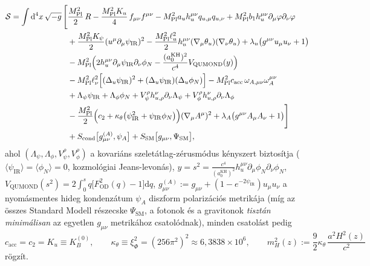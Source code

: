 \documentclass[11pt,a4paper]{article}
\begin{document}
\begin{equation}
\begin{aligned}
  \mathcal{S} = \int \mathrm{d}^4x\,\sqrt{-g}\,\Biggl[
  &\frac{M_{\mathrm{Pl}}^2}{2}\,R - \frac{M_{\mathrm{Pl}}^2 K_u}{4}\,f_{\mu\nu}f^{\mu\nu} - M_{\mathrm{Pl}}^2 a_u h_u^{\mu\nu}q_{u,\mu}q_{u,\nu} + M_{\mathrm{Pl}}^2 b_1 h_u^{\mu\nu}\partial_\mu\varphi\partial_\nu\varphi \\
  &+ \frac{M_{\mathrm{Pl}}^2 K_\psi}{2}(u^\mu\partial_\mu\psi_{\mathrm{IR}})^2 - \frac{M_{\mathrm{Pl}}^2\ell_u^2}{2}h_u^{\mu\nu}(\nabla_\mu\theta_u)(\nabla_\nu\theta_u) + \lambda_u\bigl(g^{\mu\nu}u_\mu u_\nu + 1\bigr) \\
  &- M_{\mathrm{Pl}}^2\Bigl(2 h_u^{\mu\nu}\partial_\mu\psi_{\mathrm{IR}}\partial_\nu\phi_N - \frac{(a_0^{\mathrm{KH}})^2}{c^4}V_{\mathrm{QUMOND}}(y)\Bigr) \\
  &- M_{\mathrm{Pl}}^2\ell_\nu^2\Bigl[(\Delta_u\psi_{\mathrm{IR}})^2 + (\Delta_u\psi_{\mathrm{IR}})(\Delta_u\phi_N)\Bigr] - M_{\mathrm{Pl}}^2 c_{\mathrm{acc}}\,\omega_{A,\mu\nu}\omega_A^{\mu\nu} \\
  &+ \Lambda_\psi\psi_{\mathrm{IR}} + \Lambda_\phi\phi_N + V_\psi^\rho h_{u,\rho}^\nu\partial_\nu\Lambda_\psi + V_\phi^\rho h_{u,\rho}^\nu\partial_\nu\Lambda_\phi \\
  &- \frac{M_{\mathrm{Pl}}^2}{2}\Bigl(c_2 + \kappa_\theta\bigl(\psi_{\mathrm{IR}}^2 + \psi_{\mathrm{IR}}\phi_N\bigr)\Bigr)(\nabla_\mu A^\mu)^2 + \lambda_A\bigl(g^{\mu\nu}A_\mu A_\nu + 1\bigr)\Biggr] \\
  &+ S_{\mathrm{cond}}\bigl[g_{\mu\nu}^{(A)}, \psi_A\bigr] + S_{\mathrm{SM}}\bigl[g_{\mu\nu}, \Psi_{\mathrm{SM}}\bigr],
\end{aligned}
\label{eq:master-v4-action}
\end{equation}
ahol $(\Lambda_\psi,\Lambda_\phi,V_\psi^\rho,V_\phi^\rho)$ a kovariáns szeletátlag-zérusmódus kényszert biztosítja ($\langle\psi_{\mathrm{IR}}\rangle = \langle\phi_N\rangle = 0$, kozmológiai Jeans-levonás), $y = s^2 = \frac{c^4}{(a_0^{\mathrm{KH}})^2}h_u^{\mu\nu}\partial_\mu\phi_N\partial_\nu\phi_N$, $V_{\mathrm{QUMOND}}(s^2) = 2\int_0^s q\bigl[F_{\mathrm{OD}}^2(q) - 1\bigr]\mathrm{d}q$, $g_{\mu\nu}^{(A)} := g_{\mu\nu} + (1 - e^{-2\psi_{\mathrm{IR}}})u_\mu u_\nu$ a nyomásmentes hideg kondenzátum $\psi_A$ diszform polarizációs metrikája (míg az összes Standard Modell részecske $\Psi_{\mathrm{SM}}$, a fotonok és a gravitonok \emph{tisztán minimálisan} az egyetlen $g_{\mu\nu}$ metrikához csatolódnak), minden csatolást pedig
\begin{equation}
  c_{\mathrm{acc}} = c_2 = K_u \equiv K_B^{(0)}, \qquad
  \kappa_\theta \equiv \xi_\Phi^2 = (256\pi^2)^2 \approx 6{,}3838\times 10^6, \qquad
  m_H^2(z) := \frac{9}{2}\kappa_\theta\,\frac{a^2 H^2(z)}{c^2}
  \label{eq:sl-dresser}
\end{equation}
rögzít.
\end{document}
